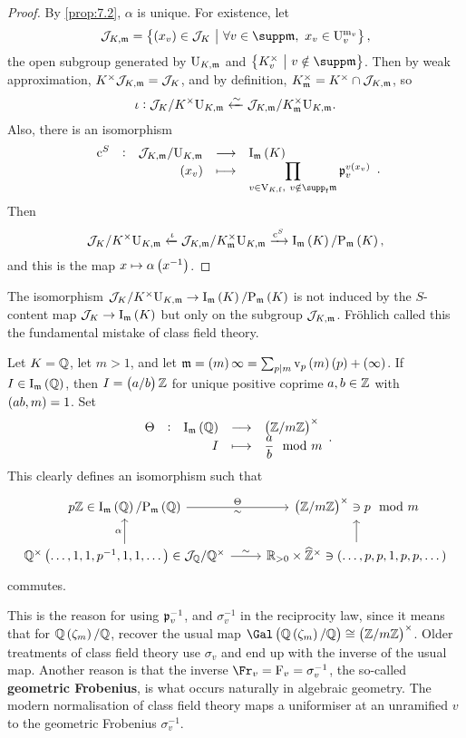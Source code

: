 \pagebreak

\begin{proof}
By \ref{prop:7.2}, $ \alpha $ is unique. For existence, let
$$ \JJJ_{K, \mmm} = \cbr{\br{x_v} \in \JJJ_K \st \forall v \in \supp \mmm, \ x_v \in \U_v^{\m_v}}, $$
the open subgroup generated by $ \mathrm{U}_{K, \mathfrak{m}} $ and $ \cbr{K_v^\times \st v \notin \supp \mmm} $. Then by weak approximation, $ K^\times\mathcal{J}_{K, \mathfrak{m}} = \mathcal{J}_K $, and by definition, $ K_{\mathfrak{m}}^\times = K^\times \cap \mathcal{J}_{K, \mathfrak{m}} $, so
$$ \iota : \mathcal{J}_K / K^\times\mathrm{U}_{K, \mathfrak{m}} \xleftarrow{\sim} \mathcal{J}_{K, \mathfrak{m}} / K_{\mathfrak{m}}^\times\mathrm{U}_{K, \mathfrak{m}}. $$
Also, there is an isomorphism
$$ \function[\c^S]{\JJJ_{K, \mmm} / \U_{K, \mmm}}{\I_\mmm\br{K}}{\br{x_v}}{\prod_{v \in \V_{K, \f}, \ v \notin \supp_\f \mmm} \ppp_v^{v\br{x_v}}}. $$
Then
$$ \JJJ_K / K^\times\U_{K, \mmm} \xleftarrow{\iota} \JJJ_{K, \mmm} / K_\mmm^\times\U_{K, \mmm} \xrightarrow{\c^S} \I_\mmm\br{K} / \P_\mmm\br{K}, $$
and this is the map $ x \mapsto \alpha\br{x^{-1}} $.
\end{proof}

\begin{remark*}
The isomorphism $ \JJJ_K / K^\times\U_{K, \mmm} \to \I_\mmm\br{K} / \P_\mmm\br{K} $ is not induced by the $ S $-content map $ \JJJ_K \to \I_\mmm\br{K} $ but only on the subgroup $ \mathcal{J}_{K, \mathfrak{m}} $. Fr\"ohlich called this the fundamental mistake of class field theory.
\end{remark*}

\begin{example*}
Let $ K = \mathbb{Q} $, let $ m > 1 $, and let $ \mmm = \br{m}\infty = \sum_{p \mid m} \v_p\br{m}\br{p} + \br{\infty} $. If $ I \in \I_\mmm\br{\QQ} $, then $ I = \br{a / b}\ZZ $ for unique positive coprime $ a, b \in \mathbb{Z} $ with $ \br{ab, m} = 1 $. Set
$$ \function[\Theta]{\I_\mmm\br{\QQ}}{\br{\ZZ / m\ZZ}^\times}{I}{\dfrac{a}{b} \mod m}. $$
This clearly defines an isomorphism such that
$$
\begin{tikzcd}
p\ZZ \in \I_\mmm\br{\QQ} / \P_\mmm\br{\QQ} \arrow{r}{\Theta}[swap]{\sim} & \br{\ZZ / m\ZZ}^\times \ni p \mod m \\
\QQ^\times\br{\dots, 1, 1, p^{-1}, 1, 1, \dots} \in \JJJ_\QQ / \QQ^\times \arrow{u}{\alpha} \arrow{r}{\sim} & \RR_{> 0} \times \widehat{\ZZ}^\times \arrow{u} \ni \br{\dots, p, p, 1, p, p, \dots}
\end{tikzcd}
$$
commutes.
\end{example*}

This is the reason for using $ \mathfrak{p}_v^{-1} $, and $ \sigma_v^{-1} $ in the reciprocity law, since it means that for $ \QQ\br{\zeta_m} / \QQ $, recover the usual map $ \Gal\br{\QQ\br{\zeta_m} / \QQ} \cong \br{\ZZ / m\ZZ}^\times $. Older treatments of class field theory use $ \sigma_v $ and end up with the inverse of the usual map. Another reason is that the inverse $ \Fr_v = \F_v = \sigma_v^{-1} $, the so-called \textbf{geometric Frobenius}, is what occurs naturally in algebraic geometry. The modern normalisation of class field theory maps a uniformiser at an unramified $ v $ to the geometric Frobenius $ \sigma_v^{-1} $.


